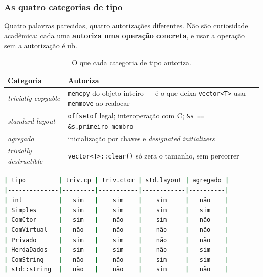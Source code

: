 \subsubsection{As quatro categorias de tipo}
\label{sec:layout-categorias}

Quatro palavras parecidas, quatro autorizações diferentes. Não são curiosidade
acadêmica: cada uma \textbf{autoriza uma operação concreta}, e usar a operação
sem a autorização é \gls{ub}.

\begin{table}[htbp]
\centering
\caption{O que cada categoria de tipo autoriza.}
\label{tab:categorias-autoriza}
\footnotesize
\begin{tabular}{@{}ll@{}}
\toprule
\textbf{Categoria} & \textbf{Autoriza} \\
\midrule
\emph{trivially copyable} & \texttt{memcpy} do objeto inteiro --- é o que deixa
                            \texttt{vector<T>} usar \texttt{memmove} ao
                            realocar \\
\emph{standard-layout}    & \texttt{offsetof} legal; interoperação com C;
                            \texttt{\&s == \&s.primeiro\_membro} \\
\emph{agregado}           & inicialização por chaves e \emph{designated
                            initializers} \\
\emph{trivially destructible} & \texttt{vector<T>::clear()} só zera o tamanho,
                            sem percorrer \\
\bottomrule
\end{tabular}
\end{table}

\begin{lstlisting}[style=bt, language=bash,
    caption={Saída de \texttt{src/layout/}: os \emph{traits} instanciados sobre
             oito cobaias.}]
| tipo         | triv.cp | triv.ctor | std.layout | agregado |
|--------------|---------|-----------|------------|----------|
| int          |   sim   |    sim    |    sim     |   não    |
| Simples      |   sim   |    sim    |    sim     |   sim    |
| ComCtor      |   sim   |    não    |    sim     |   não    |
| ComVirtual   |   não   |    não    |    não     |   não    |
| Privado      |   sim   |    sim    |    não     |   não    |
| HerdaDados   |   sim   |    sim    |    não     |   sim    |
| ComString    |   não   |    não    |    sim     |   sim    |
| std::string  |   não   |    não    |    sim     |   não    |
\end{lstlisting}

